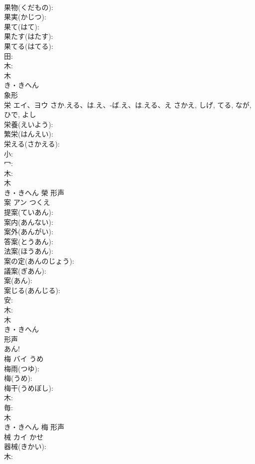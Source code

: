 \documentclass[8pt]{extreport}
\begin{document}
\begin{CJK}{UTF8}{min}
\\	果物(くだもの): 
\\	果実(かじつ): 
\\	果て(はて): 
\\	果たす(はたす): 
\\	果てる(はてる): 
\\	田: 
\\	木: 
\\	木	
\\	き・きへん	
\\	象形 
\\	栄	エイ、ヨウ	さか.える、は.え、-ば.え、は.える、え	さかえ, しげ, てる, なが, ひで, よし	
\\	栄養(えいよう): 
\\	繁栄(はんえい): 
\\	栄える(さかえる): 
\\	小: 
\\	冖: 
\\	木: 
\\	木	
\\	き・きへん	榮	形声 
\\	案	アン	つくえ		
\\	提案(ていあん): 
\\	案内(あんない): 
\\	案外(あんがい): 
\\	答案(とうあん): 
\\	法案(ほうあん): 
\\	案の定(あんのじょう): 
\\	議案(ぎあん): 
\\	案(あん): 
\\	案じる(あんじる): 
\\	安: 
\\	木: 
\\	木	
\\	き・きへん	
\\	形声 
\\	あん!
\\	梅	バイ	うめ		
\\	梅雨(つゆ): 
\\	梅(うめ): 
\\	梅干(うめぼし): 
\\	木: 
\\	毎: 
\\	木	
\\	き・きへん	梅	形声 
\\	械	カイ	かせ		
\\	器械(きかい): 
\\	木: 

\end{CJK}
\end{document}
